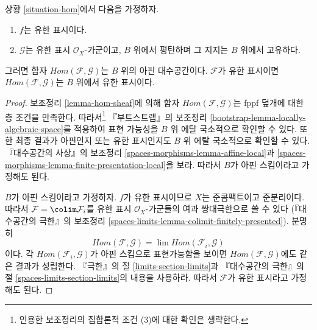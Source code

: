 \begin{proposition}
\label{proposition-hom}
상황 \ref{situation-hom}에서 다음을 가정하자.
\begin{enumerate}
\item $f$는 유한 표시이다.
\item $\mathcal{G}$는 유한 표시 $\mathcal{O}_X$-가군이고,
$B$ 위에서 평탄하며 그 지지는 $B$ 위에서 고유하다.
\end{enumerate}
그러면 함자 $\mathit{Hom}(\mathcal{F}, \mathcal{G})$는
$B$ 위의 아핀 대수공간이다. $\mathcal{F}$가 유한 표시이면
$\mathit{Hom}(\mathcal{F}, \mathcal{G})$는 $B$ 위에서 유한 표시이다.
\end{proposition}

\begin{proof}
보조정리 \ref{lemma-hom-sheaf}에 의해 함자
$\mathit{Hom}(\mathcal{F}, \mathcal{G})$는 fppf 덮개에 대한
층 조건을 만족한다. 따라서\footnote{인용한 보조정리의 집합론적 조건
(3)에 대한 확인은 생략한다.} 『부트스트랩』의 보조정리
\ref{bootstrap-lemma-locally-algebraic-space}를 적용하여 표현 가능성을
$B$ 위 에탈 국소적으로 확인할 수 있다.
또한 최종 결과가 아핀인지 또는 유한 표시인지도 $B$ 위 에탈 국소적으로
확인할 수 있다. 『대수공간의 사상』의 보조정리
\ref{spaces-morphisms-lemma-affine-local}과
\ref{spaces-morphisms-lemma-finite-presentation-local}을 보라.
따라서 $B$가 아핀 스킴이라고 가정해도 된다.

\medskip\noindent
$B$가 아핀 스킴이라고 가정하자. $f$가 유한 표시이므로
$X$는 준콤팩트이고 준분리이다.
따라서 $\mathcal{F} = \colim \mathcal{F}_i$를 유한 표시
$\mathcal{O}_X$-가군들의 여과 쌍대극한으로 쓸 수 있다
(『대수공간의 극한』의 보조정리
\ref{spaces-limits-lemma-colimit-finitely-presented}). 분명히
$$
\mathit{Hom}(\mathcal{F}, \mathcal{G}) =
\lim \mathit{Hom}(\mathcal{F}_i, \mathcal{G})
$$
이다. 각 $\mathit{Hom}(\mathcal{F}_i, \mathcal{G})$가 아핀 스킴으로
표현가능함을 보이면 $\mathit{Hom}(\mathcal{F}, \mathcal{G})$에도
같은 결과가 성립한다. 『극한』의 절 \ref{limits-section-limits}과
『대수공간의 극한』의 절 \ref{spaces-limits-section-limits}의 내용을
사용하라. 따라서 $\mathcal{F}$가 유한 표시라고 가정해도 된다.


\end{proof}
